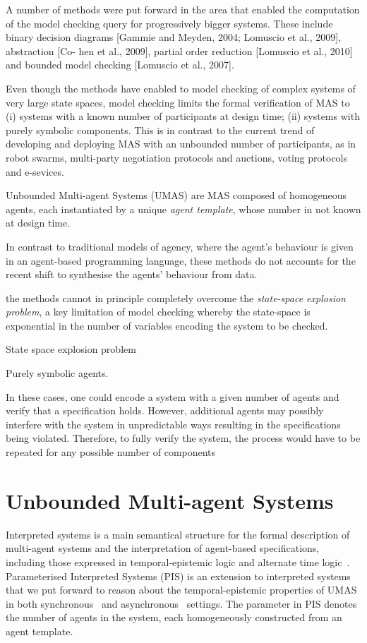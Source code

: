 \documentclass{article}
\begin{document}
A number of methods were put forward in the area that enabled the computation of
the model checking query for progressively bigger systems. These include binary
decision diagrams [Gammie and Meyden, 2004; Lomuscio et al., 2009], abstraction
[Co- hen et al., 2009], partial order reduction [Lomuscio et al., 2010] and
bounded model checking [Lomuscio et al., 2007].

Even though the methods have enabled to model checking of complex systems of
very large state spaces, model checking limits the formal verification of MAS to
(i) systems with a known number of participants at design time; (ii) systems
with purely symbolic components. This is in contrast to the current trend of
developing and deploying MAS with an unbounded number of participants, as in
robot swarms, multi-party negotiation protocols and auctions, voting protocols
and e-sevices. 

Unbounded Multi-agent Systems (UMAS) are MAS composed of homogeneous agents,
each instantiated by a unique {\em agent template}, whose number in not known at
design time. 

In contrast to traditional models of agency, where the agent’s behaviour is
given in an agent-based programming language, these methods do not accounts for
the recent shift to synthesise the agents’ behaviour from data.



the methods cannot in principle completely overcome the {\em state-space
explosion problem}, a key limitation of model checking whereby the state-space
is exponential in the number of variables encoding the system to be checked. 

State space explosion problem

Purely symbolic agents. 

In these cases, one could encode a system with a given number of agents and
verify that a specification holds. However, additional agents may possibly
interfere with the system in unpredictable ways resulting in the specifications
being violated. Therefore, to fully verify the system, the process would have to
be repeated for any possible number of components

\section{Unbounded Multi-agent Systems}

Interpreted systems is a main semantical structure for the formal description of
multi-agent systems and the interpretation of agent-based specifications,
including those expressed in temporal-epistemic logic and alternate time
logic~\cite{Fagin+95b,LomuscioRaimondi06c}. Parameterised Interpreted Systems
(PIS)  is an extension to interpreted systems  that we put forward  to reason
about the temporal-epistemic properties of UMAS in both
synchronous~\cite{KouvarosLomuscio15b} and
asynchronous~\cite{KouvarosLomuscio16a} settings.   The parameter in PIS denotes
the number of agents in the system, each homogeneously constructed from an agent
template. 
\end{document}
